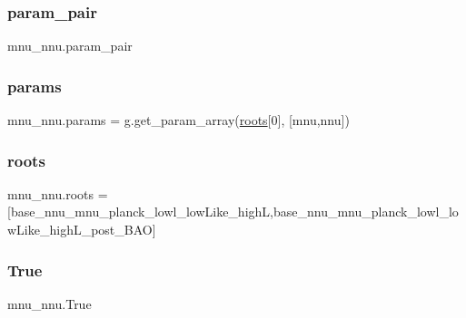 \subsubsection{\texorpdfstring{param\+\_\+pair}{param\_pair}}
{\footnotesize\ttfamily mnu\+\_\+nnu.\+param\+\_\+pair}

\mbox{\label{namespacemnu__nnu_adbdcccec642b041e02a8ec6dc95c2040}} 
\subsubsection{\texorpdfstring{params}{params}}
{\footnotesize\ttfamily mnu\+\_\+nnu.\+params = g.\+get\+\_\+param\+\_\+array(\mbox{\hyperlink{namespacemnu__nnu_a4416420354c9eab25c0721d55acdf3f3}{roots}}\mbox{[}0\mbox{]}, \mbox{[}\textquotesingle{}mnu\textquotesingle{},\textquotesingle{}nnu\textquotesingle{}\mbox{]})}

\mbox{\label{namespacemnu__nnu_a4416420354c9eab25c0721d55acdf3f3}} 
\subsubsection{\texorpdfstring{roots}{roots}}
{\footnotesize\ttfamily mnu\+\_\+nnu.\+roots = \mbox{[}\textquotesingle{}base\+\_\+nnu\+\_\+mnu\+\_\+planck\+\_\+lowl\+\_\+low\+Like\+\_\+highL\textquotesingle{},\textquotesingle{}base\+\_\+nnu\+\_\+mnu\+\_\+planck\+\_\+lowl\+\_\+low\+Like\+\_\+high\+L\+\_\+post\+\_\+\+B\+AO\textquotesingle{}\mbox{]}}

\mbox{\label{namespacemnu__nnu_a39d57732eb79cf06749e8e0ab7b49f2b}} 
\subsubsection{\texorpdfstring{True}{True}}
{\footnotesize\ttfamily mnu\+\_\+nnu.\+True}

